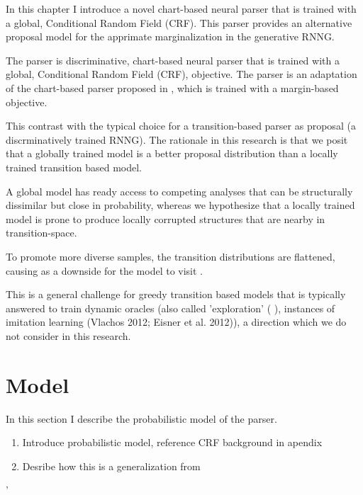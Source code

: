 


In this chapter I introduce a novel chart-based neural parser that is trained with a global, Conditional Random Field (CRF). This parser provides an alternative proposal model for the apprimate marginalization in the generative RNNG.

The parser is discriminative, chart-based neural parser that is trained with a global, Conditional Random Field (CRF), objective. The parser is an adaptation of the chart-based parser proposed in \cite{Stern+2017:Minimal}, which is trained with a margin-based objective.

This contrast with the typical choice for a transition-based parser as proposal (a discrminatively trained RNNG). The rationale in this research is that we posit that a globally trained model is a better proposal distribution than a locally trained transition based model.

A global model has ready access to competing analyses that can be structurally dissimilar but close in probability, whereas we hypothesize that a locally trained model is prone to produce locally corrupted structures that are nearby in transition-space.

To promote more diverse samples, the transition distributions are flattened, causing as a downside for the model to visit .

This is a general challenge for greedy transition based models that is typically answered to train dynamic oracles \citep{Goldberg+2013:dynamic} (also called 'exploration' (\citep{Ballesteros+2016:exploration} \citep{Stern+2017:Minimal}), instances of imitation learning (Vlachos 2012; Eisner et al. 2012)), a direction which we do not consider in this research.


\section{Model}
In this section I describe the probabilistic model of the parser.
\begin{enumerate}
  \item Introduce probabilistic model, reference CRF background in apendix
  \item Desribe how this is a generalization from \citep{Stern+2017:Minimal}
\end{enumerate}'

